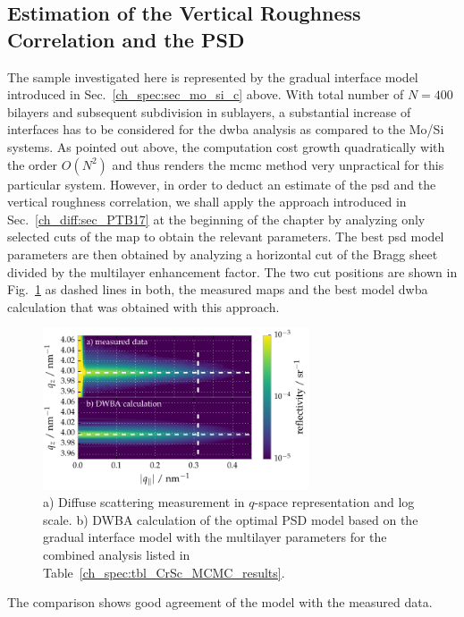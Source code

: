 \subsection{Estimation of the Vertical Roughness Correlation and the PSD}
The sample investigated here is represented by the gradual interface model introduced in Sec.~\ref{ch_spec:sec_mo_si_c} above. With total number of $N=400$ bilayers and subsequent subdivision in sublayers, a substantial increase of interfaces has to be considered for the \gls{dwba} analysis as compared to the Mo/Si systems. As pointed out above, the computation cost growth quadratically with the order $O(N^2)$ and thus renders the \gls{mcmc} method very unpractical for this particular system. However, in order to deduct an estimate of the \gls{psd} and the vertical roughness correlation, we shall apply the approach introduced in Sec.~\ref{ch_diff:sec_PTB17} at the beginning of the chapter by analyzing only selected cuts of the map to obtain the relevant parameters. The best \gls{psd} model parameters are then obtained by analyzing a horizontal cut of the Bragg sheet divided by the multilayer enhancement factor. The two cut positions are shown in Fig.~\ref{ch_diff:fig_CrSc_diffuse_measured_vs_dwba} as dashed lines in both, the measured maps and the best model \gls{dwba} calculation that was obtained with this approach.
\begin{figure}[htbp]
  \centering
  \includegraphics[width=0.7\textwidth]{img/CrSc_diffuse_measured_vs_dwba}
  \caption[Diffuse scattering measurement and DWBA calculation for the Cr/Sc mirror.]{a) Diffuse scattering measurement in $q$-space representation and 
log scale. b) DWBA calculation of the optimal PSD model based on the gradual interface model with the multilayer parameters for the combined analysis listed 
in Table~\ref{ch_spec:tbl_CrSc_MCMC_results}.}
  \label{ch_diff:fig_CrSc_diffuse_measured_vs_dwba}
\end{figure}
The comparison shows good agreement of the model with the measured data.

